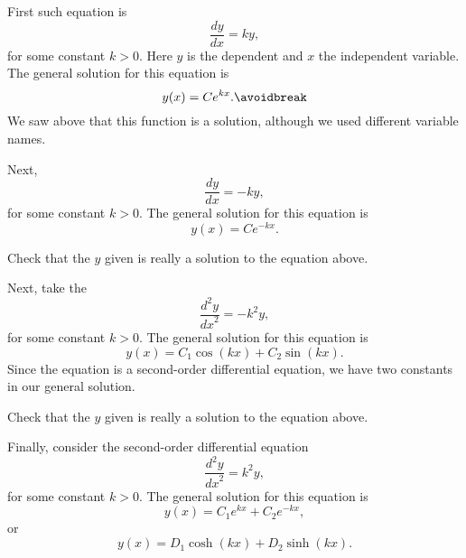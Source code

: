 \medskip

First such equation is
\begin{equation*}
\frac{dy}{dx} = k y ,
\end{equation*}
for some constant $k > 0$.
Here $y$ is the dependent and $x$ the independent variable.
The general solution for this equation is
\begin{equation*}
y(x) = C e^{kx} .
\avoidbreak
\end{equation*}
We saw above that this function is a solution, although we used different
variable names.

\medskip

Next,
\begin{equation*}
\frac{dy}{dx} = -k y ,
\end{equation*}
for some constant $k > 0$.
The general solution for this equation is
\begin{equation*}
y(x) = C e^{-kx} .
\end{equation*}

\begin{exercise}
Check that the $y$ given is really a solution to the equation above.
\end{exercise}

Next, take the
\emph{}
\begin{equation*}
\frac{d^2y}{{dx}^2} = -k^2 y ,
\end{equation*}
for some constant $k > 0$.
The general solution for this equation is
\begin{equation*}
y(x) = C_1 \cos(kx) + C_2 \sin(kx) .
\end{equation*}
Since the equation is a second-order differential equation,
we have two constants in our general solution.

\begin{exercise}
Check that the $y$ given is really a solution to the equation above.
\end{exercise}

Finally, consider the second-order differential equation
\begin{equation*}
\frac{d^2y}{{dx}^2} = k^2 y ,
\end{equation*}
for some constant $k > 0$.
The general solution for this equation is
\begin{equation*}
y(x) = C_1 e^{kx} + C_2 e^{-kx} ,
\end{equation*}
or
\begin{equation*}
y(x) = D_1 \cosh(kx) + D_2 \sinh(kx) .
\end{equation*}


